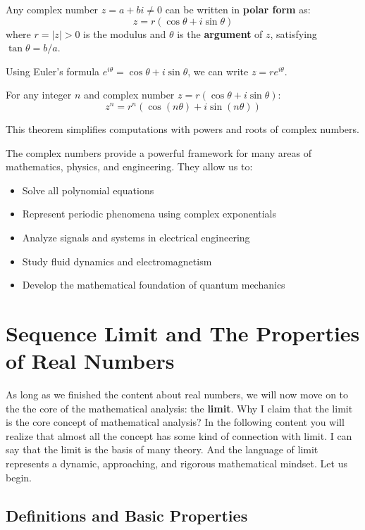\begin{definition}
Any complex number $z = a + bi \neq 0$ can be written in \textbf{polar form} as:
\[
z = r(\cos\theta + i\sin\theta)
\]
where $r = |z| > 0$ is the modulus and $\theta$ is the \textbf{argument} of $z$, satisfying $\tan\theta = b/a$.
\end{definition}

Using Euler's formula $e^{i\theta} = \cos\theta + i\sin\theta$, we can write $z = re^{i\theta}$.

\begin{theorem}
For any integer $n$ and complex number $z = r(\cos\theta + i\sin\theta)$:
\[
z^n = r^n(\cos(n\theta) + i\sin(n\theta))
\]
\end{theorem}

This theorem simplifies computations with powers and roots of complex numbers.

The complex numbers provide a powerful framework for many areas of mathematics, physics, and engineering. They allow us to:
\begin{itemize}
    \item Solve all polynomial equations
    \item Represent periodic phenomena using complex exponentials
    \item Analyze signals and systems in electrical engineering
    \item Study fluid dynamics and electromagnetism
    \item Develop the mathematical foundation of quantum mechanics
\end{itemize}

\section{Sequence Limit and The Properties of Real Numbers}

As long as we finished the content about real numbers, we will now move on to the the core of the mathematical analysis: the \textbf{limit}. Why I claim that the limit is the core concept of mathematical analysis? In the following content you will realize that almost all the concept has some kind of connection with limit. I can say that the limit is the basis of many theory. And the language of limit represents a dynamic, approaching, and rigorous mathematical mindset. Let us begin.

\subsection{Definitions and Basic Properties}

